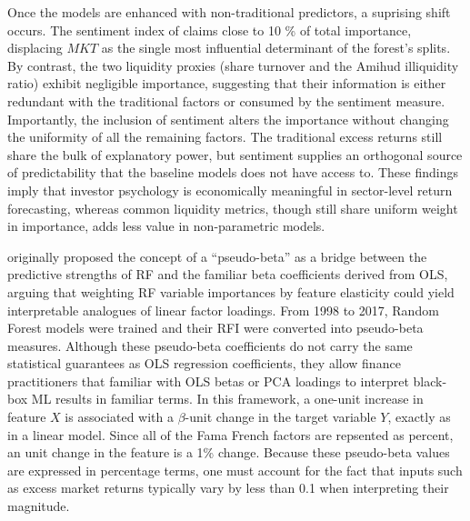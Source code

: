Once the models are enhanced with non-traditional predictors, a suprising shift occurs. The sentiment index of  claims close to 10 \% of total importance, displacing $MKT$ as the single most influential determinant of the forest's splits. By contrast, the two liquidity proxies (share turnover and the Amihud illiquidity ratio) exhibit negligible importance, suggesting that their information is either redundant with the traditional factors or consumed by the sentiment measure. Importantly, the inclusion of sentiment alters the importance without changing the uniformity of all the remaining factors. The traditional excess returns still share the bulk of explanatory power, but sentiment supplies an orthogonal source of predictability that the baseline models does not have access to. These findings imply that investor psychology is economically meaningful in sector-level return forecasting, whereas common liquidity metrics, though still share uniform weight in importance, adds less value in non-parametric models.


 






 originally proposed the concept of a “pseudo-beta” as a bridge between the predictive strengths of RF and the familiar beta coefficients derived from OLS, arguing that weighting RF variable importances by feature elasticity could yield interpretable analogues of linear factor loadings. From 1998 to 2017, Random Forest models were trained and their RFI were converted into pseudo-beta measures. Although these pseudo-beta coefficients do not carry the same statistical guarantees as OLS regression coefficients, they allow finance practitioners that familiar with OLS betas or PCA loadings to interpret black-box ML results in familiar terms. In this framework, a one-unit increase in feature $X$ is associated with a $\beta$-unit change in the target variable $Y$, exactly as in a linear model. Since all of the Fama French factors are repsented as percent, an unit change in the feature is a 1\% change. Because these pseudo-beta values are expressed in percentage terms, one must account for the fact that inputs such as excess market returns typically vary by less than 0.1 when interpreting their magnitude.

